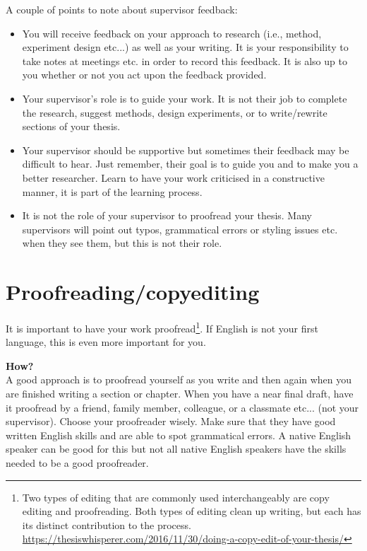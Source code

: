 A couple of points to note about supervisor feedback:
\begin{itemize}
	\item You will receive feedback on your approach to research (i.e., method,
	      experiment design etc...) as well as your writing. It is your responsibility to
	      take notes at meetings etc. in order to record this feedback. It is also up to
	      you whether or not you act upon the feedback provided.
	\item Your supervisor's role is to guide your work. It is not their job to complete
	      the research, suggest methods, design experiments, or to write/rewrite sections
	      of your thesis.
	\item Your supervisor should be supportive but sometimes their feedback may be
	      difficult to hear. Just remember, their goal is to guide you and to make you a
	      better researcher. Learn to have your work criticised in a constructive manner,
	      it is part of the learning process.
	\item It is not the role of your supervisor to proofread your thesis. Many
	      supervisors will point out typos, grammatical errors or styling issues etc.
	      when they see them, but this is not their role.
\end{itemize}
\newpage

\section{Proofreading/copyediting} \label{app:proofreading}
It is important to have your work proofread\footnote{Two types of editing that
	are commonly used interchangeably are copy editing and proofreading. Both types
	of editing clean up writing, but each has its distinct contribution to the
	process.
	\url{https://thesiswhisperer.com/2016/11/30/doing-a-copy-edit-of-your-thesis/}}.
If English is not your first language, this is even more important for you.

\textbf{How?}\\
A good approach is to proofread yourself as you write and then again when you are finished writing a section or chapter. When you have a near final draft, have it proofread by a friend, family member, colleague, or a classmate etc... (not your supervisor). Choose your proofreader wisely. Make sure that they have good written English skills and are able to spot grammatical errors. A native English speaker can be good for this but not all native English speakers have the skills needed to be a good proofreader.

